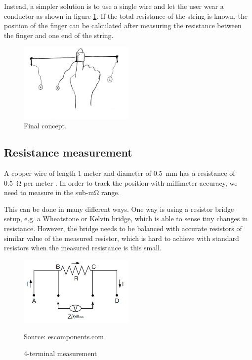 \documentclass{article}
\newcommand{\source}[1]{\hfill \vspace{-15pt} \caption*{ \footnotesize Source: {#1}} }
\begin{document}
Instead, a simpler solution is to use a single wire and let the user wear a conductor as shown in figure \ref{fig:slidarr_final_concept}. If the total resistance of the string is known, the position of the finger can be calculated after measuring the resistance between the finger and one end of the string.

\begin{figure}[ht]
  \centering
  \includegraphics[width=0.5\textwidth]{slidarr_final_concept}
  \caption{Final concept.}
  \label{fig:slidarr_final_concept}
\end{figure}

\subsection{Resistance measurement} \label{sec:resistance_measurement}
A copper wire of length 1 meter and diameter of \SI{0.5}{mm} has a resistance of \SI{0.5}{\ohm} per meter \cite{copperresistance}. In order to track the position with millimeter accuracy, we need to measure in the sub-\si{\milli\ohm} range. 

This can be done in many different ways. One way is using a resistor bridge setup, e.g. a Wheatstone or Kelvin bridge, which is able to sense tiny changes in resistance. However, the bridge needs to be balanced with accurate resistors of similar value of the measured resistor, which is hard to achieve with standard resistors when the measured resistance is this small.

\begin{figure}[ht]
  \centering
  \includegraphics[width=0.5\textwidth]{Kelvin_Connections}
  \caption{4-terminal measurement}
  \source{escomponents.com}
  \label{fig:4terminal}
\end{figure}
\end{document}
